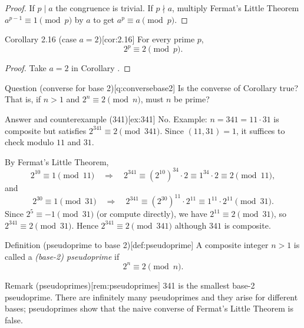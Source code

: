 \documentclass[10pt]{article}
\theoremstyle{definition}
\theoremstyle{plain}
\numberwithin{equation}{section}
\begin{document}
\begin{proof}
If $p\mid a$ the congruence is trivial. If $p\nmid a$, multiply Fermat's Little Theorem
$a^{p-1}\equiv 1\pmod p$ by $a$ to get $a^p\equiv a\pmod p$.
\end{proof}

\begin{define}{Corollary 2.16 (case $a=2$)}[cor:2.16]
For every prime $p$,
\[
2^p\equiv 2\pmod p.
\]
\end{define}

\begin{proof}
Take $a=2$ in Corollary .
\end{proof}

\begin{define}{Question (converse for base 2)}[q:conversebase2]
Is the converse of Corollary  true? That is, if $n>1$ and
$2^n\equiv 2\pmod n$, must $n$ be prime?
\end{define}

\begin{define}{Answer and counterexample (341)}[ex:341]
No. Example: $n=341=11\cdot 31$ is composite but satisfies $2^{341}\equiv 2\pmod{341}$.
Since $(11,31)=1$, it suffices to check modulo $11$ and $31$.

By Fermat's Little Theorem,
\[
2^{10}\equiv 1\pmod{11}\quad\Rightarrow\quad 2^{341} \equiv (2^{10})^{34}\cdot 2 \equiv 1^{34}\cdot 2 \equiv 2\pmod{11},
\]
and
\[
2^{30}\equiv 1\pmod{31}\quad\Rightarrow\quad 2^{341} \equiv (2^{30})^{11}\cdot 2^{11} \equiv 1^{11}\cdot 2^{11}\pmod{31}.
\]
Since $2^{5}\equiv -1\pmod{31}$ (or compute directly), we have $2^{11}\equiv 2\pmod{31}$,
so $2^{341}\equiv 2\pmod{31}$. Hence $2^{341}\equiv 2\pmod{341}$ although $341$ is composite.
\end{define}

\begin{define}{Definition (pseudoprime to base 2)}[def:pseudoprime]
A composite integer $n>1$ is called a \emph{(base-2) pseudoprime} if
\[
2^n\equiv 2\pmod n.
\]
\end{define}

\begin{define}{Remark (pseudoprimes)}[rem:pseudoprimes]
341 is the smallest base-2 pseudoprime. There are infinitely many pseudoprimes and they
arise for different bases; pseudoprimes show that the naive converse of Fermat's Little
Theorem is false.
\end{define}

\end{document}
